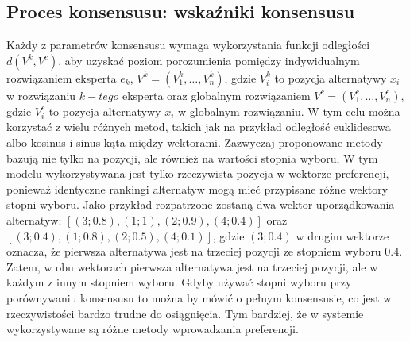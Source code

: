 \subsection{Proces konsensusu: wskaźniki konsensusu}
Każdy z parametrów konsensusu wymaga wykorzystania funkcji odległości
$d(V^k,V^c)$, aby uzyskać poziom porozumienia pomiędzy indywidualnym
rozwiązaniem eksperta $e_k$, $V^k = (V^k_1, \dotsc, V^k_n)$, gdzie $V^k_i$ to
pozycja alternatywy $x_i$ w rozwiązaniu $k-tego$ eksperta oraz globalnym
rozwiązaniem $V^c = (V^c_1, \dotsc, V^c_n)$, gdzie $V^c_i$ to pozycja
alternatywy $x_i$ w globalnym rozwiązaniu. W tym celu można korzystać z wielu
różnych metod, takich jak na przykład odległość euklidesowa albo kosinus i sinus
kąta między wektorami. Zazwyczaj proponowane metody bazują nie tylko na pozycji,
ale również na wartości stopnia wyboru, W tym modelu wykorzystywana jest
tylko rzeczywista pozycja w wektorze preferencji, ponieważ identyczne rankingi
alternatyw mogą mieć przypisane różne wektory stopni wyboru. Jako przykład
rozpatrzone zostaną dwa wektor uporządkowania alternatyw: $[(3;0.8), (1;1),
(2;0.9), (4;0.4)]$ oraz $[(3;0.4), (1;0.8), (2;0.5), (4;0.1)]$, gdzie $(3; 0.4)$
w drugim wektorze oznacza, że pierwsza alternatywa jest na trzeciej pozycji ze
stopniem wyboru $0.4$. Zatem, w obu wektorach pierwsza alternatywa jest na
trzeciej pozycji, ale w każdym z innym stopniem wyboru. Gdyby używać stopni
wyboru przy porównywaniu konsensusu to można by mówić o pełnym konsensusie, co
jest w rzeczywistości bardzo trudne do osiągnięcia. Tym bardziej, że w systemie
wykorzystywane są różne metody wprowadzania preferencji.


